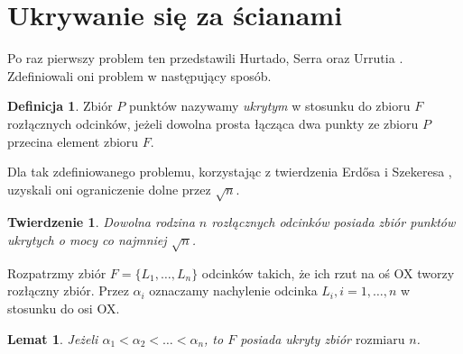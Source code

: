 \documentclass[brudnopis]{xmgr}
\newtheorem{Twierdzenie}{Twierdzenie}
\newtheorem{Lemat}{Lemat}
\theoremstyle{definition}
\newtheorem{Definicja}{Definicja}
\begin{document}
\section{Ukrywanie się za ścianami}
Po raz pierwszy problem ten przedstawili Hurtado, Serra oraz Urrutia \cite{sciany}. Zdefiniowali oni problem w następujący sposób.

\begin{Definicja}\label{ukrywanie definicja}
 Zbiór $P$ punktów nazywamy \emph{ukrytym} w stosunku do zbioru $F$ rozłącznych odcinków, jeżeli dowolna prosta łącząca dwa punkty ze zbioru $P$ przecina element zbioru $F$.
\end{Definicja}

Dla tak zdefiniowanego problemu, korzystając z twierdzenia Erd{\H o}sa i Szekeresa \cite{erdosszekeres}, uzyskali oni ograniczenie dolne przez $\sqrt{n}$.

\begin{Twierdzenie}\label{moc zbioru ukrytego tw} \cite{illumination}
  Dowolna rodzina $n$ rozłącznych odcinków posiada zbiór punktów ukrytych o mocy co najmniej $\sqrt{n}$.
\end{Twierdzenie}

Rozpatrzmy zbiór $F = \{L_1,\ldots,L_n\}$ odcinków takich, że ich rzut na oś OX tworzy rozłączny zbiór. Przez $\alpha_i$ oznaczamy nachylenie odcinka $L_i, i = 1,\ldots,n$ w stosunku do osi OX.
\begin{Lemat}\label{zbior ukryty} \cite{illumination}
  Jeżeli $\alpha_1 < \alpha_2 < \ldots < \alpha_n$, to $F$ posiada ukryty zbiór $\mbox{rozmiaru $n$}$.
\end{Lemat}
\end{document}
